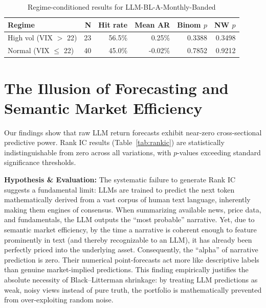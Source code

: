 \documentclass[12pt]{report}
\begin{document}
\begin{table}[H]
    \centering
    \caption{Regime-conditioned results for LLM-BL-A-Monthly-Banded}
    \label{tab:regime}
    \begin{tabular}{lrrrrr}
        \toprule
        Regime                & N  & Hit rate & Mean AR & Binom $p$ & NW $p$ \\
        \midrule
        High vol (VIX $>$ 22) & 23 & 56.5\%   & 0.25\%  & 0.3388    & 0.3498 \\
        Normal (VIX $\le$ 22) & 40 & 45.0\%   & -0.02\% & 0.7852    & 0.9212 \\
        \bottomrule
    \end{tabular}
\end{table}

\section{The Illusion of Forecasting and Semantic Market Efficiency}
Our findings show that raw LLM return forecasts exhibit near-zero cross-sectional predictive power.
Rank IC results (Table~\ref{tab:rankic}) are statistically indistinguishable from zero across all variations, with $p$-values exceeding standard significance thresholds.

\textbf{Hypothesis \& Evaluation:} The systematic failure to generate Rank IC suggests a fundamental limit: LLMs are trained to predict the next token mathematically derived from a vast corpus of human text language, inherently making them engines of consensus.
When summarizing available news, price data, and fundamentals, the LLM outputs the ``most probable'' narrative. Yet, due to semantic market efficiency, by the time a narrative is coherent enough to feature prominently in text (and thereby recognizable to an LLM), it has already been perfectly priced into the underlying asset. Consequently, the ``alpha'' of narrative prediction is zero.
Their numerical point-forecasts act more like descriptive labels than genuine market-implied predictions. This finding empirically justifies the absolute necessity of Black--Litterman shrinkage: by treating LLM predictions as weak, noisy views instead of pure truth, the portfolio is mathematically prevented from over-exploiting random noise.
\end{document}
